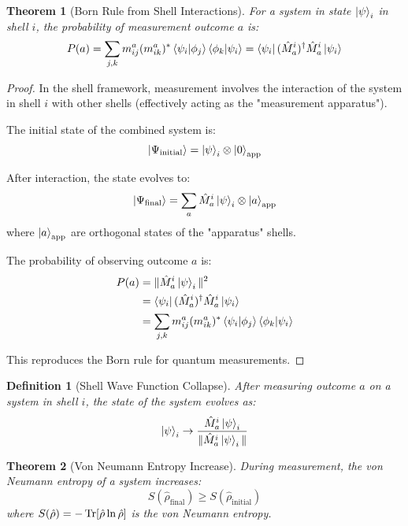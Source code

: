 \documentclass[12pt,a4paper]{article}
\newtheorem{theorem}{Theorem}[section]
\newtheorem{definition}{Definition}[section]
\begin{document}
\begin{theorem}[Born Rule from Shell Interactions]
\label{thm:born-rule}
For a system in state $\ket{\psi}_i$ in shell $i$, the probability of measurement outcome $a$ is:
\begin{equation}
P(a) = \sum_{j,k} m_{ij}^a (m_{ik}^a)^* \braket{\psi_i}{\phi_j}\braket{\phi_k}{\psi_i} = \bra{\psi_i} (\hat{M}_a^i)^\dagger \hat{M}_a^i \ket{\psi_i}
\end{equation}
\end{theorem}

\begin{proof}
In the shell framework, measurement involves the interaction of the system in shell $i$ with other shells (effectively acting as the "measurement apparatus").

The initial state of the combined system is:
\begin{equation}
\ket{\Psi_{\text{initial}}} = \ket{\psi}_i \otimes \ket{0}_{\text{app}}
\end{equation}

After interaction, the state evolves to:
\begin{equation}
\ket{\Psi_{\text{final}}} = \sum_a \hat{M}_a^i \ket{\psi}_i \otimes \ket{a}_{\text{app}}
\end{equation}
where $\ket{a}_{\text{app}}$ are orthogonal states of the "apparatus" shells.

The probability of observing outcome $a$ is:
\begin{align}
P(a) &= \|\hat{M}_a^i \ket{\psi}_i\|^2 \\
&= \bra{\psi_i} (\hat{M}_a^i)^\dagger \hat{M}_a^i \ket{\psi_i} \\
&= \sum_{j,k} m_{ij}^a (m_{ik}^a)^* \braket{\psi_i}{\phi_j}\braket{\phi_k}{\psi_i}
\end{align}

This reproduces the Born rule for quantum measurements.
\end{proof}

\begin{definition}[Shell Wave Function Collapse]
\label{def:wavefunction-collapse}
After measuring outcome $a$ on a system in shell $i$, the state of the system evolves as:
\begin{equation}
\ket{\psi}_i \to \frac{\hat{M}_a^i \ket{\psi}_i}{\|\hat{M}_a^i \ket{\psi}_i\|}
\end{equation}
\end{definition}

\begin{theorem}[Von Neumann Entropy Increase]
\label{thm:entropy-increase}
During measurement, the von Neumann entropy of a system increases:
\begin{equation}
S(\hat{\rho}_{\text{final}}) \geq S(\hat{\rho}_{\text{initial}})
\end{equation}
where $S(\hat{\rho}) = -\Tr[\hat{\rho}\ln\hat{\rho}]$ is the von Neumann entropy.
\end{theorem}
\end{document}
